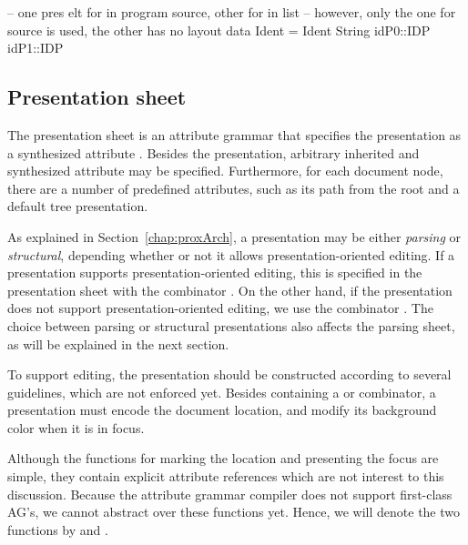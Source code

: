 -- one pres elt for in program source, other for in list
-- however, only the one for source is used, the other has no layout
data Ident = Ident String                                 { idP0::IDP idP1::IDP }

\ec

\subsection{Presentation sheet}

The presentation sheet is an attribute grammar that specifies the presentation as a synthesized attribute . Besides the presentation, arbitrary inherited and synthesized attribute may be specified. Furthermore, for each document node, there are a number of predefined attributes, such as its path from the root and a default tree presentation.


As explained in Section~\ref{chap:proxArch}, a presentation may be either {\em parsing} or {\em structural}, depending whether or not it allows presentation-oriented editing. If a presentation supports presentation-oriented editing, this is specified in the presentation sheet with the combinator . On the other hand, if the presentation does not support presentation-oriented editing, we use the combinator .  The choice between parsing or structural presentations also affects the parsing sheet, as will be explained in the next section. 

To support editing, the presentation should be constructed according to several guidelines, which are not enforced yet. Besides containing a  or  combinator, a presentation must encode the document location, and modify its background color when it is in focus. 

Although the functions for marking the location and presenting the focus are simple, they contain explicit attribute references which are not interest to this discussion. Because the attribute grammar compiler does not support first-class AG's, we cannot abstract over these functions yet. Hence, we will denote the two functions by  and .  

